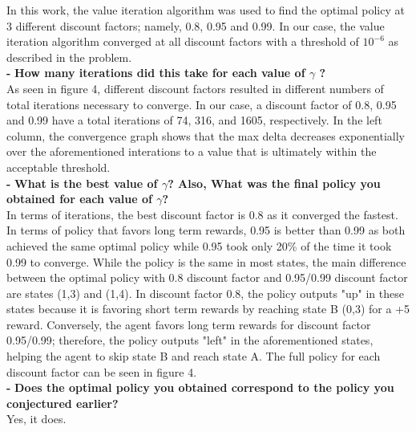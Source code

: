 \documentclass[11pt]{article}
\begin{document}
\noindent
In this work, the value iteration algorithm was used to find the optimal policy
at 3 different discount factors; namely, 0.8, 0.95 and 0.99. In our case, the
value iteration algorithm converged at all discount factors with a threshold of
$10^{-6}$ as described in the problem.\\


\noindent
\textbf{-}
\noindent
\textbf{How many iterations did this take for each value of $\gamma$ ?}
\\

\noindent
As seen in figure 4, different discount factors resulted in different numbers of
total iterations necessary to converge. In our case, a discount factor of 0.8,
0.95 and 0.99 have a total iterations of 74, 316, and 1605, respectively. In the
left column, the convergence graph shows that the max delta decreases
exponentially over the aforementioned interations to a value that is ultimately
within the acceptable threshold.
\\

\noindent
\textbf{-}
\noindent
\textbf{What is the best value of $\gamma$? Also, What was the final policy you
obtained for each value of $\gamma$?}
\\

\noindent
In terms of iterations, the best discount factor is 0.8 as it converged the
fastest. In terms of policy that favors long term rewards, 0.95 is better than
0.99 as both achieved the same optimal policy while 0.95 took only 20\% of the
time it took 0.99 to converge. While the policy is the same in most states, the
main difference between the optimal policy with 0.8 discount factor and
0.95/0.99 discount factor are states (1,3) and (1,4). In discount factor 0.8,
the policy outputs "up" in these states because it is favoring short term
rewards by reaching state B (0,3) for a +5 reward. Conversely, the agent favors
long term rewards for discount factor 0.95/0.99; therefore, the policy outputs
"left" in the aforementioned states, helping the agent to skip state B and reach
state A. The full policy for each discount factor can be seen in figure 4.
\\

\noindent
\textbf{-}
\noindent
\textbf{Does the optimal policy you obtained correspond to the policy you
conjectured earlier?}
\\

\noindent
Yes, it does.
\\
\end{document}
